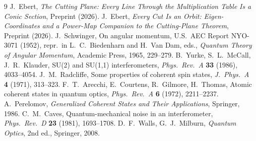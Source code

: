 \documentclass[11pt]{amsart}
\theoremstyle{remark}
\begin{document}
\begin{thebibliography}{9}
 J.~Ebert, \emph{The Cutting Plane: Every Line Through the Multiplication Table Is a Conic Section}, Preprint (2026).
 J.~Ebert, \emph{Every Cut Is an Orbit: Eigen-Coordinates and a Power-Map Companion to the Cutting-Plane Theorem}, Preprint (2026).
 J.~Schwinger, On angular momentum, U.S.\ AEC Report NYO-3071 (1952), repr.\ in L.~C.~Biedenharn and H.~Van Dam, eds., \emph{Quantum Theory of Angular Momentum}, Academic Press, 1965, 229--279.
 B.~Yurke, S.~L.~McCall, J.~R.~Klauder, SU(2) and SU(1,1) interferometers, \emph{Phys.\ Rev.\ A} \textbf{33} (1986), 4033--4054.
 J.~M.~Radcliffe, Some properties of coherent spin states, \emph{J.\ Phys.\ A} \textbf{4} (1971), 313--323.
 F.~T.~Arecchi, E.~Courtens, R.~Gilmore, H.~Thomas, Atomic coherent states in quantum optics, \emph{Phys.\ Rev.\ A} \textbf{6} (1972), 2211--2237.
 A.~Perelomov, \emph{Generalized Coherent States and Their Applications}, Springer, 1986.
 C.~M.~Caves, Quantum-mechanical noise in an interferometer, \emph{Phys.\ Rev.\ D} \textbf{23} (1981), 1693--1708.
 D.~F.~Walls, G.~J.~Milburn, \emph{Quantum Optics}, 2nd ed., Springer, 2008.
\end{thebibliography}
\end{document}
